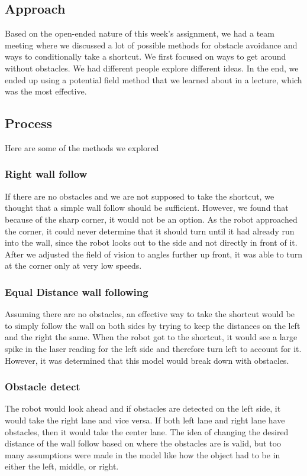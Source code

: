 \documentclass[journal, a4paper]{IEEEtran}
\begin{document}
\subsection{Approach}
Based on the open-ended nature of this week's assignment, we had a team meeting where we discussed a lot of possible methods for obstacle avoidance and ways to conditionally take a shortcut. We first focused on ways to get around without obstacles. We had different people explore different ideas. In the end, we ended up using a potential field method that we learned about in a lecture, which was the most effective.
\subsection{Process}
Here are some of the methods we explored
\subsubsection{Right wall follow}
If there are no obstacles and we are not supposed to take the shortcut, we thought that a simple wall follow should be sufficient. However, we found that because of the sharp corner, it would not be an option. As the robot approached the corner, it could never determine that it should turn until it had already run into the wall, since the robot looks out to the side and not directly in front of it. After we adjusted the field of vision to angles further up front, it was able to turn at the corner only at very low speeds. 
\subsubsection{Equal Distance wall following}
Assuming there are no obstacles, an effective way to take the shortcut would be to simply follow the wall on both sides by trying to keep the distances on the left and the right the same. When the robot got to the shortcut, it would see a large spike in the laser reading for the left side and therefore turn left to account for it. However, it was determined that this model would break down with obstacles. 
\subsubsection{Obstacle detect}
The robot would look ahead and if obstacles are detected on the left side, it would take the right lane and vice versa. If both left lane and right lane have obstacles, then it would take the center lane. The idea of changing the desired distance of the wall follow based on where the obstacles are is valid, but too many assumptions were made in the model like how the object had to be in either the left, middle, or right. 
\end{document}
